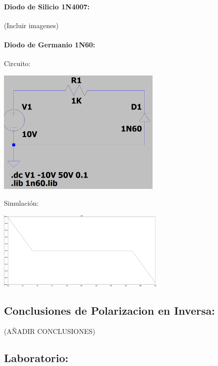 \paragraph{Diodo de Silicio 1N4007:}

(Incluir imagenes)

\paragraph{Diodo de Germanio 1N60:}

Circuito:

\vspace{0.5cm}

\includegraphics[width=8cm]{imagenes/Circuito4.png}\\

\vspace{0.5cm}

Simulación:

\includegraphics[width=8.2cm]{imagenes/simulacion4.png}\\

\subsection{Conclusiones de Polarizacion en Inversa:}
(AÑADIR CONCLUSIONES)


\subsection{Laboratorio:}
 